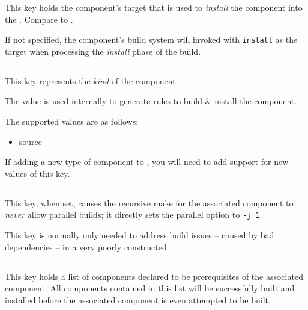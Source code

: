 This key holds the component's \makefile target that is used to
\emph{install} the component into the \destdir.  Compare to
.

If not specified, the component's build system will invoked with
\texttt{install} as the target when processing the \emph{install}
phase of the build.

\label{variables:install-target}

\subsection{}\label{variables:kind}

This key represents the \emph{kind} of the component.

The value is used internally to generate \make rules to build \&
install the component.

The supported values are as follows:

\begin{itemize}
\item source
\end{itemize}

If adding a new type of component to \lmsbw, you will need to add
support for new values of this key.


\subsection{}\label{variables:no-parallel}

This key, when set, causes the recursive make for the associated
component to \emph{never} allow parallel builds; it directly sets the
\gnumake parallel option to \texttt{-j 1}.

This key is normally only needed to address build issues -- caused by
bad dependencies -- in a very poorly constructed \makefile.


\subsection{}\label{variables:prerequisite}

This key holds a list of components declared to be prerequisites of
the associated component.  All components contained in this list will
be successfully built and installed before the associated component is
even attempted to be built.

